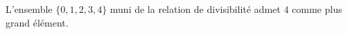 L'ensemble $\{0,1,2,3,4\}$ muni de la relation de divisibilité admet $4$ comme plus grand élément.

\begin{reponses}
\end{reponses}

